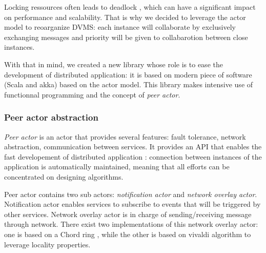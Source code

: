 Locking ressources often leads to deadlock \cite{agha:1986}, which can have
a significant impact on performance and scalability. That is why we decided to
leverage the actor model to reoarganize DVMS: each instance will collaborate
by exclusively exchanging messages and priority will be given to collabarotion
between close instances.

With that in mind, we created a new library whose role is to ease the
development of distributed application: it is based on modern piece of software
(Scala and akka) based on the actor model. This library makes intensive use of
functionnal programming and the concept of \emph{peer actor}.

\subsubsection{Peer actor abstraction}

\emph{Peer actor} is an actor that provides several features: fault tolerance,
network abstraction, communication between services. It provides an API that 
enables the fast developement of distributed application : connection between
instances of the application is automatically maintained, meaning that all 
efforts can be concentrated on designing algorithms.

Peer actor contains two sub actors: \emph{notification actor} and \emph{network
overlay actor}. Notification actor enables services to subscribe to events that
will be triggered by other services. Network overlay actor is in charge of 
sending/receiving message through network. There exist two implementations of 
this network overlay actor: one is based on a Chord ring \cite{stoica2001chord},
while the other is based on vivaldi algorithm to leverage locality properties.

